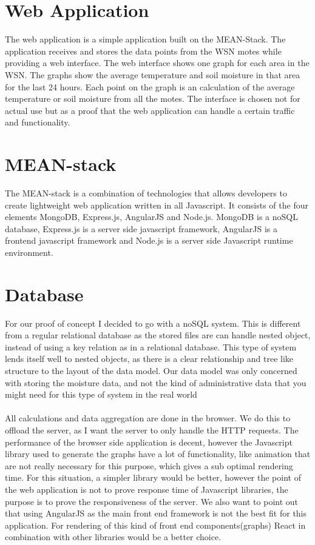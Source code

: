 \documentclass[]{uiophd}
\begin{document}
\section{Web Application}
The web application is a simple application built on the MEAN-Stack. The application receives and stores the data points from the WSN motes while providing a web interface. The web interface shows one graph for each area in the WSN. The graphs show the average temperature and soil moisture in that area for the last 24 hours. Each point on the graph is an calculation of the average temperature or soil moisture from all the motes. The interface is chosen not for actual use but as a proof that the web application can handle a certain traffic and functionality. 

\section{MEAN-stack}
The MEAN-stack is a combination of technologies that allows developers to create lightweight web application written in all Javascript. It consists of the four elements MongoDB, Express.js, AngularJS and Node.js. MongoDB is a noSQL database, Express.js is a server side javascript framework, AngularJS is a frontend javascript framework and Node.js is a server side Javascript runtime environment. 

\section{Database}
For our proof of concept I decided to go with a noSQL system. This is different from a regular relational database as the stored files are can handle nested object, instead of using a key relation as in a relational database. This type of system lends itself well to nested objects, as there is a clear relationship and tree like structure to the layout of the data model. Our data model was only concerned with storing the moisture data, and not the kind of administrative data that you might need for this type of system in the real world
\\\\
All calculations and data aggregation are done in the browser. We do this to offload the server, as I want the server to only handle the HTTP requests. The performance of the browser side application is decent, however the Javascript library used to generate the graphs have a lot of functionality, like animation that are not really necessary for this purpose, which gives a sub optimal rendering time. For this situation, a simpler library would be better, however the point of the web application is not to prove response time of Javascript libraries, the purpose is to prove the responsiveness of the server. We also want to point out that using AngularJS as the main front end framework is not the best fit for this application. For rendering of this kind of front end components(graphs) React in combination with other libraries would be a better choice. 
\end{document}
